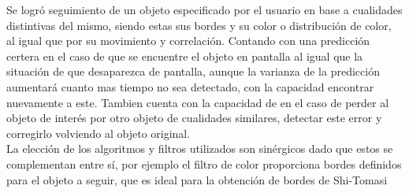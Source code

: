Se logró seguimiento de un objeto especificado por el usuario en base a cualidades distintivas del mismo, siendo estas sus bordes y su color o distribución de color, al igual que por su movimiento y correlación. Contando con una predicción certera en el caso de que se encuentre el objeto en pantalla al igual que la situación de que desaparezca de pantalla, aunque la varianza de la predicción aumentará cuanto mas tiempo no sea detectado, con la capacidad encontrar nuevamente a este. Tambien cuenta con la capacidad de en el caso de perder al objeto de interés por otro objeto de cualidades similares, detectar este error y corregirlo volviendo al objeto original.\\
La elección de los algoritmos y filtros utilizados son sinérgicos dado que estos se complementan entre sí, por ejemplo el filtro de color proporciona bordes definidos para el objeto a seguir, que es ideal para la obtención de bordes de Shi-Tomasi
